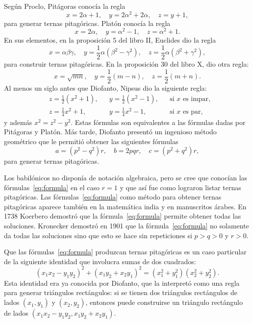 Según Proclo, Pitágoras conocía la regla 
\[
	x=2\alpha+1,\quad
	y=2\alpha^2+2\alpha,\quad
	z=y+1,
\]
para generar ternas pitagóricas. Platón conocía la regla 
\[
	x=2\alpha,\quad
	y=\alpha^2-1,\quad
	z=\alpha^2+1.
\]
En sus elementos, en la proposición 5 del libro II, Euclides dio la regla 
\[
		x=\alpha\beta\gamma,
		\quad
		y=\frac12\alpha(\beta^2-\gamma^2),
		\quad
		z=\frac12\alpha(\beta^2+\gamma^2),
\]
para construir ternas pitagóricas.  En la proposición 30 del libro X, dio otra
regla:
\[
		x=\sqrt{mn},\quad
		y=\frac12(m-n),\quad
		z=\frac12(m+n).
\]
Al menos un siglo antes que Diofanto, Nipsus dio la siguiente regla: 
\begin{align*}
	&z=\frac12(x^2+1), && y=\frac12(x^2-1), &&\text{si $x$ es impar},\\
	&z=\frac14x^2+1, && y=\frac14x^2-1, &&\text{si $x$ es par},
\end{align*}
y además $x^2=z^2-y^2$. Estas fórmulas son equivalentes a las fórmulas dadas
por Pitágoras y Platón. Más tarde, Diofanto presentó un ingenioso método
geométrico que le permitió obtener las siguientes fórmulas 
\begin{equation}
	\label{eq:formula}
	a=(p^2-q^2)r,\quad
	b=2pqr,\quad
	c=(p^2+q^2)r,
\end{equation}
para generar ternas pitagóricas. 

Los babilónicos no disponía de notación algebraica, pero se cree que 
conocían  
las fórmulas~\eqref{eq:formula} en el caso $r=1$ y que así fue como lograron
listar ternas pitagóricas. Las fórmulas~\eqref{eq:formula} como método para
obtener ternas pitagóricas aparece también en la matemática india y en
manuscritos árabes. 
En 1738 Koerbero demostró que la fórmula~\eqref{eq:formula} permite obtener
todas las soluciones. Kronecker demostró en 1901 que la
fórmula~\eqref{eq:formula} no solamente da todas las soluciones sino que esto
se hace sin repeticiones si $p>q>0$ y $r>0$. 

Que las fórmulas~\eqref{eq:formula} produzcan ternas pitagóricas es un caso
particular de la siguiente identidad que involucra sumas de dos cuadrados:
\begin{equation}
	\label{eq:2cuadrados}
	(x_1x_2-y_1y_2)^2+(x_1y_2+x_2y_1)^2=(x_1^2+y_1^2)(x_2^2+y_2^2).
\end{equation}
Esta identidad era ya conocida por Diofanto, que la interpretó como una regla
para generar triángulos rectángulos: si se tienen dos triángulos rectángulos de
lados $(x_1,y_1)$ y $(x_2,y_2)$, entonces puede construirse un triángulo
rectángulo de lados $(x_1x_2-y_1y_2, x_1y_2+x_2y_1)$.  

